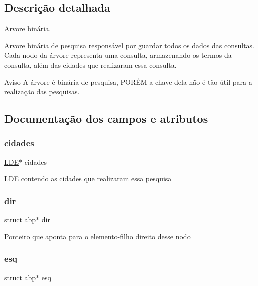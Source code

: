 \subsection{Descrição detalhada}
Arvore binária. 

Arvore binária de pesquisa responsável por guardar todos os dados das consultas. Cada nodo da árvore representa uma consulta, armazenando os termos da consulta, além das cidades que realizaram essa consulta.

\begin{DoxyWarning}{Aviso}
A árvore é binária de pesquisa, P\+O\+RÉM a chave dela não é tão útil para a realização das pesquisas. 
\end{DoxyWarning}


\subsection{Documentação dos campos e atributos}
\mbox{\label{structabp_ac621929c65d21c284f2897d0dc34777c}} 
\subsubsection{\texorpdfstring{cidades}{cidades}}
{\footnotesize\ttfamily \hyperlink{struct_8h_ae030205799002e4fc414e374283d8598}{L\+DE}$\ast$ cidades}

{\ttfamily L\+DE} contendo as cidades que realizaram essa pesquisa \mbox{\label{structabp_a68e9acbab0de7ab617165c904c98334f}} 
\subsubsection{\texorpdfstring{dir}{dir}}
{\footnotesize\ttfamily struct \hyperlink{structabp}{abp}$\ast$ dir}

Ponteiro que aponta para o elemento-\/filho direito desse nodo \mbox{\label{structabp_aa1052089fda0e5ed652bbe60126de869}} 
\subsubsection{\texorpdfstring{esq}{esq}}
{\footnotesize\ttfamily struct \hyperlink{structabp}{abp}$\ast$ esq}


